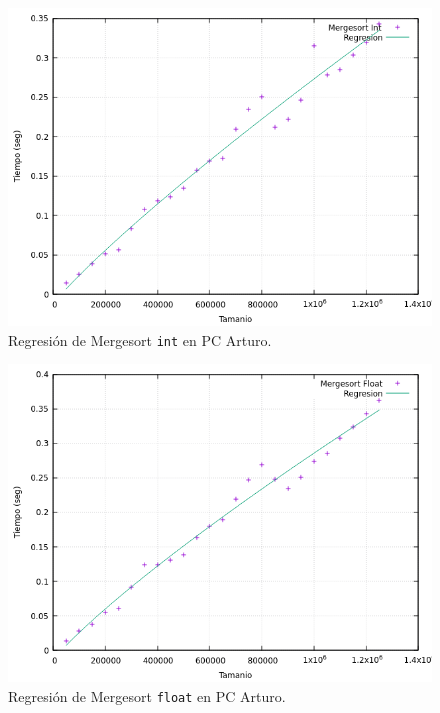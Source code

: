 \documentclass[12pt]{article}
\begin{document}
    \begin{figure}
        \centering
        \includegraphics[width=0.8\linewidth]{images/Mergesort/Mergesort_Regresion_Int.png}
        \cprotect\caption{Regresión de Mergesort \verb|int| en PC Arturo.}
        \label{fig:MergesortRegresionInt}
    \end{figure}

    \begin{figure}
        \centering
        \includegraphics[width=0.8\linewidth]{images/Mergesort/Mergesort_Regresion_Flt.png}
        \cprotect\caption{Regresión de Mergesort \verb|float| en PC Arturo.}
        \label{fig:MergesortRegresionFloat}
    \end{figure}
\end{document}
